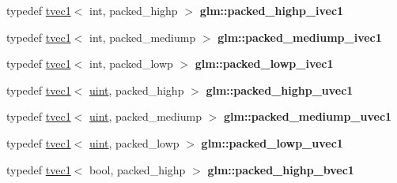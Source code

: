 \begin{DoxyCompactItemize}
\item 
\mbox{\label{group__gtc__type__aligned_gaec852395d791b6ecacee46c7308db6e9}} 
typedef \hyperlink{structglm_1_1tvec1}{tvec1}$<$ int, packed\+\_\+highp $>$ {\bfseries glm\+::packed\+\_\+highp\+\_\+ivec1}
\item 
\mbox{\label{group__gtc__type__aligned_ga0e4bfeba8aa6b0fd84abfca9d2dcc076}} 
typedef \hyperlink{structglm_1_1tvec1}{tvec1}$<$ int, packed\+\_\+mediump $>$ {\bfseries glm\+::packed\+\_\+mediump\+\_\+ivec1}
\item 
\mbox{\label{group__gtc__type__aligned_ga4e0147efb3901f6459b7d2c80a1e23fd}} 
typedef \hyperlink{structglm_1_1tvec1}{tvec1}$<$ int, packed\+\_\+lowp $>$ {\bfseries glm\+::packed\+\_\+lowp\+\_\+ivec1}
\item 
\mbox{\label{group__gtc__type__aligned_gaf5761ca585ef8aa7aa85efd0f62c0c39}} 
typedef \hyperlink{structglm_1_1tvec1}{tvec1}$<$ \hyperlink{group__core__precision_ga4fd29415871152bfb5abd588334147c8}{uint}, packed\+\_\+highp $>$ {\bfseries glm\+::packed\+\_\+highp\+\_\+uvec1}
\item 
\mbox{\label{group__gtc__type__aligned_gabde8aa40669369c3caeb44a88f323c94}} 
typedef \hyperlink{structglm_1_1tvec1}{tvec1}$<$ \hyperlink{group__core__precision_ga4fd29415871152bfb5abd588334147c8}{uint}, packed\+\_\+mediump $>$ {\bfseries glm\+::packed\+\_\+mediump\+\_\+uvec1}
\item 
\mbox{\label{group__gtc__type__aligned_gac7075bf9986d0fda492553dcc8dba144}} 
typedef \hyperlink{structglm_1_1tvec1}{tvec1}$<$ \hyperlink{group__core__precision_ga4fd29415871152bfb5abd588334147c8}{uint}, packed\+\_\+lowp $>$ {\bfseries glm\+::packed\+\_\+lowp\+\_\+uvec1}
\item 
\mbox{\label{group__gtc__type__aligned_ga377e3268d132071ff041d9a1c960b2db}} 
typedef \hyperlink{structglm_1_1tvec1}{tvec1}$<$ bool, packed\+\_\+highp $>$ {\bfseries glm\+::packed\+\_\+highp\+\_\+bvec1}
\item 
\mbox{\label{group__gtc__type__aligned_ga556942046cd364d388d949bddd4c8111}} 

\end{DoxyCompactItemize}
